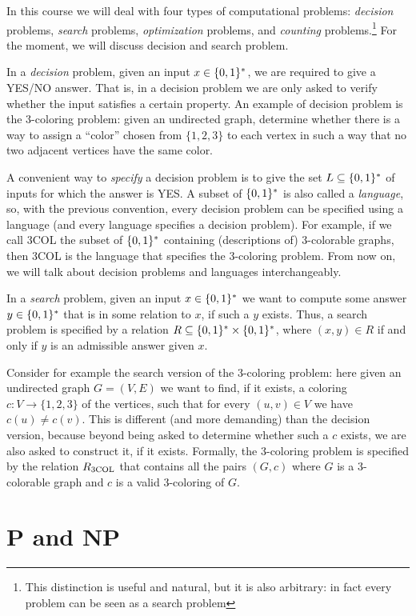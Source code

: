 In this course we will deal with four types of computational
problems: {\em decision} problems, {\em search} problems,
{\em optimization} problems, and {\em counting} problems.\footnote{%
This distinction is useful and natural, but it is also
arbitrary: in fact every problem can be seen as a search problem}
For the moment, we will discuss decision and search problem.

In a {\em decision} problem, given an input $x \in \{0,1\}^*$, we
are required to give a YES/NO answer. That is, in a decision
problem we are only asked to verify whether the input
satisfies a certain property. An example of decision 
problem is the 3-coloring problem: given an undirected
graph, determine whether there is a way to assign a ``color''
chosen from $\{1,2,3\}$ to each vertex in such a way
that no two adjacent vertices have the same color.

A convenient way to {\em specify} a decision problem
is to give the set $L \subseteq \{0,1\}^*$ of inputs for which
the answer is YES. A subset of $\{0,1\}^*$ is also called
a {\em language}, so, with the previous convention,
every decision problem can be specified
using a language (and every language specifies a decision
problem). For example, if we call 3COL the subset of
$\{0,1\}^*$ containing (descriptions of) 3-colorable graphs,
then 3COL is the language that specifies the 3-coloring
problem. From now on, we will talk about decision problems
and languages interchangeably.

In a {\em search} problem, given an input $x\in \{0,1\}^*$ we
want to compute some answer $y\in \{0,1\}^*$ that is in some
relation to $x$, if such a $y$ exists. Thus, a search
problem is specified by a relation $R \subseteq \{0,1\}^* \times \{0,1\}^*$,
where $(x,y) \in R$ if and only if $y$ is an admissible
answer given $x$.

Consider for example the search version of the 3-coloring
problem: here given an undirected graph $G= (V,E)$ we
want to find, if it exists, a coloring $c : V \to \{1,2,3\}$
of the vertices, such that for every $(u,v)\in V$ we
have $c(u) \neq c(v)$. This is different (and more demanding)
than the decision version, because beyond being asked
to determine whether such a $c$ exists, we are also asked
to construct it, if it exists. Formally, the 3-coloring
problem is specified by the relation $R_{\rm 3COL}$ that
contains all the pairs $(G,c)$ where $G$ is a 3-colorable
graph and $c$ is a valid 3-coloring of $G$.

\section*{P and NP}

